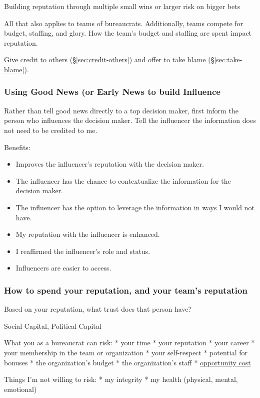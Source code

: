 Building reputation through multiple small wins or larger risk on bigger bets

All that also applies to teams of bureaucrats. Additionally, teams compete for budget, staffing, and glory. How the team's budget and staffing are spent impact reputation. 


Give credit to others (\S\ref{sec:credit-others}) and offer to take blame (\S\ref{sec:take-blame}).

\subsubsection{Using Good News (or Early News to build Influence}
Rather than tell good news directly to a top decision maker, first inform the person who influences the decision maker. Tell the influencer the information does not need to be credited to me.

Benefits:
\begin{itemize}
    \item Improves the influencer's reputation with the decision maker.
    \item The influencer has the chance to contextualize the information for the decision maker.
    \item The influencer has the option to leverage the information in ways I would not have.
    \item My reputation with the influencer is enhanced.
    \item I reaffirmed the influencer's role and status.
    \item Influencers are easier to access.
\end{itemize}

\subsubsection{How to spend your reputation, and your team's reputation}
Based on your reputation, what trust does that person have? 

Social Capital, Political Capital

What you as a bureaucrat can risk:
* your time
* your reputation
* your career
* your membership in the team or organization
* your self-respect
* potential for bonuses
* the organization's budget
* the organization's staff
* \href{https://en.wikipedia.org/wiki/Opportunity_cost}{opportunity cost}

Things I'm not willing to risk:
* my integrity
* my health (physical, mental, emotional)


